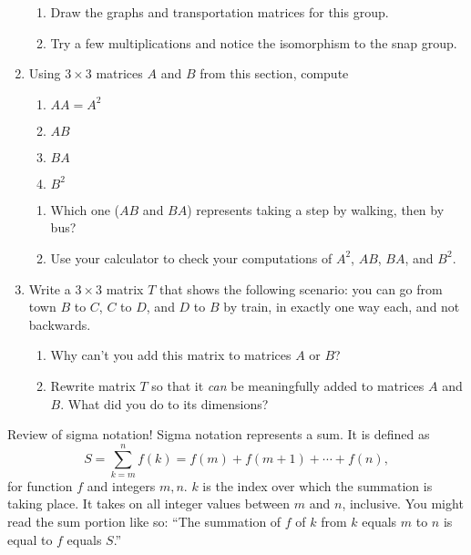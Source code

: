 \documentclass[../gatm.tex]{subfiles}
\begin{document}
\begin{enumerate}
\begin{enumerate}
\item Draw the graphs and transportation matrices for this group.
\item Try a few multiplications and notice the isomorphism to the snap group.
\end{enumerate}
\item Using $3\times 3$ matrices $A$ and $B$ from this section, compute
\begin{multicols}{4}
\begin{enumerate}
\item $AA=A^2$
\item $AB$
\item $BA$
\item $B^2$
\setcounter{mtrx_mult_problem_ii}{\value{enumii}}
\end{enumerate}
\end{multicols}
\begin{enumerate}
\setcounter{enumii}{\value{mtrx_mult_problem_ii}}
\item Which one ($AB$ and $BA$) represents taking a step by walking, then by bus?
\item Use your calculator to check your computations of $A^2$, $AB$, $BA$, and $B^2$.
\end{enumerate}
\item Write a $3\times 3$ matrix $T$ that shows the following scenario: you can go from town $B$ to $C$, $C$ to $D$, and $D$ to $B$ by train, in exactly one way each, and not backwards.
\begin{enumerate}
\item Why can't you add this matrix to matrices $A$ or $B$?
\item Rewrite matrix $T$ so that it \textit{can} be meaningfully added to matrices $A$ and $B$. What did you do to its dimensions?
\end{enumerate}
\setcounter{mtrx_mult_problem_i}{\value{enumi}}
\end{enumerate}

Review of sigma notation! Sigma notation represents a sum. It is defined as
$$S=\sum_{k=m}^{n} f(k)=f(m)+f(m+1)+\cdots + f(n),$$
for function $f$ and integers $m,n$. $k$ is the index over which the summation is taking place. It takes on all integer values between $m$ and $n$, inclusive. You might read the sum portion like so: ``The summation of $f$ of $k$ from $k$ equals $m$ to $n$ is equal to $f$ equals $S$.''
\end{document}
